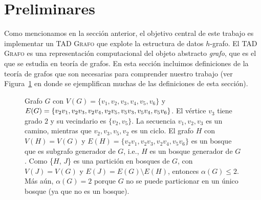 \documentclass[%
    a4paper,%
    fontsize=12pt,%
    DIV=12,
    twoside,%
    openright,%
    titlepage=true,%
    headsepline,%
    toc=bibliography,%
    parskip=half,%
    cleardoublepage=empty,%
    headings=big,%
]{scrbook}
\newcommand{\Grafo}{\textsc{Grafo}\xspace}
\begin{document}
\section{Preliminares}
\label{sec:definiciones}

Como mencionamos en la sección anterior, el objetivo central de este trabajo es implementar un TAD \Grafo que explote la estructura de datos $h$-grafo.  El TAD \Grafo es una representación computacional del objeto abstracto \emph{grafo}, que es el que se estudia en teoría de grafos.  En esta sección incluimos definiciones de la teoría de grafos que son necesarias para comprender nuestro trabajo (ver Figura~\ref{fig:definiciones} en donde se ejemplifican muchas de las definiciones de esta sección).

\begin{figure}[t]
\parindent=0pt\small
  \centering

  \caption{Grafo $G$ con $V(G) = \{v_1,v_2,v_3,v_4,v_5,v_6\}$ y $E(G) =\{v_2v_1,\penalty0 v_2v_3,\penalty0 v_2v_4,\penalty0 v_2v_5,\penalty0 v_5v_3, \penalty0 v_5v_4, \penalty0 v_5v_6\}$.  El vértice $v_3$ tiene grado $2$ y su vecindario es $\{v_2,v_5\}$. La secuencia $v_1, v_2, v_3$ es un camino, mientras que $v_2,v_3,v_5,v_2$ es un ciclo.  El grafo $H$ con $V(H) = V(G)$ y $E(H) = \{v_2v_1, v_2v_3, v_2v_4, v_5v_6\}$ es un bosque que es subgrafo generador de $G$, i.e., $H$ es un bosque generador de $G$.  Como \{$H$, $J$\} es una partición en bosques de $G$, con $V(J) = V(G)$ y $E(J) = E(G) \setminus E(H)$, entonces $\alpha(G) \leq 2$.  Más aún, $\alpha(G) = 2$ porque $G$ no se puede particionar en un único bosque (ya que no es un bosque).}\label{fig:definiciones}
\end{figure}
\end{document}
